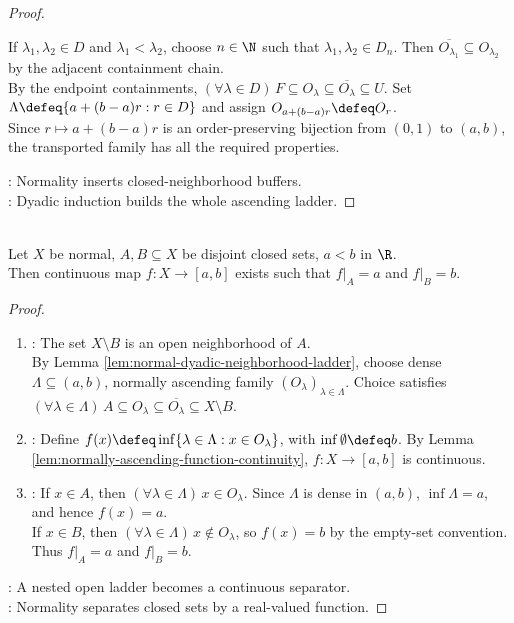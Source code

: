 \begin{lemma}
\begin{proof}
\begin{enumerate}[label=(\roman*)]
If $\lambda_1,\lambda_2\in D$ and $\lambda_1<\lambda_2$, choose $n\in\N$ such that $\lambda_1,\lambda_2\in D_n$. Then $\overline{O_{\lambda_1}}\subseteq O_{\lambda_2}$ by the adjacent containment chain.\\
By the endpoint containments, $(\forall\lambda\in D)\,F\subseteq O_\lambda\subseteq\overline{O_\lambda}\subseteq U$. Set $\Lambda\defeq\{a+(b-a)r:r\in D\}$ and assign $O_{a+(b-a)r}\defeq O_r$.\\
Since $r\mapsto a+(b-a)r$ is an order-preserving bijection from $(0,1)$ to $(a,b)$, the transported family has all the required properties.
\end{enumerate}
: Normality inserts closed-neighborhood buffers.\\
: Dyadic induction builds the whole ascending ladder.
\end{proof}
\end{lemma}

\begin{theorem} \label{thm:urysohn-lemma-normal-space} \\
Let $X$ be normal, $A,B\subseteq X$ be disjoint closed sets, $a<b$ in $\R$.\\
Then continuous map $f:X\to[a,b]$ exists such that $f|_A=a$ and $f|_B=b$.
\begin{proof}
\begin{enumerate}[label=(\roman*)]
\setlength{\itemsep}{0pt}
\item {}: The set $X\setminus B$ is an open neighborhood of $A$.\\
By Lemma \ref{lem:normal-dyadic-neighborhood-ladder}, choose dense $\Lambda\subseteq(a,b)$, normally ascending family $(O_\lambda)_{\lambda\in\Lambda}$. Choice satisfies $(\forall\lambda\in\Lambda)\,A\subseteq O_\lambda\subseteq\overline{O_\lambda}\subseteq X\setminus B$.
\item {}: Define $f(x)\defeq\inf\limits\{\lambda\in\Lambda:x\in O_\lambda\}$, with $\inf\limits\emptyset\defeq b$. By Lemma \ref{lem:normally-ascending-function-continuity}, $f:X\to[a,b]$ is continuous.
\item {}: If $x\in A$, then $(\forall\lambda\in\Lambda)\,x\in O_\lambda$. Since $\Lambda$ is dense in $(a,b)$, $\inf\limits\Lambda=a$, and hence $f(x)=a$.\\
If $x\in B$, then $(\forall\lambda\in\Lambda)\,x\notin O_\lambda$, so $f(x)=b$ by the empty-set convention. Thus $f|_A=a$ and $f|_B=b$.
\end{enumerate}
: A nested open ladder becomes a continuous separator.\\
: Normality separates closed sets by a real-valued function.
\end{proof}
\end{theorem}

